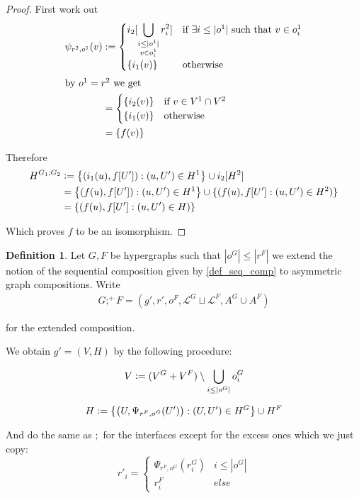 \documentclass[12pt]{article}
\theoremstyle{definition}
\newtheorem{definition}[theorem]{Definition}
\newcommand{\defeq}{\vcentcolon=}
\newcommand{\1}{\mathbbm{1}}
\renewcommand{\L}{\mathcal{L}}
\newcommand{\seq}{;}
\begin{document}
\begin{proof}
    First work out
    \begin{align*}
        \psi_{r^2, o^1}(v) &:= 
        \begin{cases}
            i_2[\displaystyle\bigcup_{\substack{i\leq |o^1| \\ v \in o^1_i}} r^2_i]& \text{if } \exists i \leq |o^1| \text{ such that } v \in o^1_i \\
            \{i_1(v)\} & \text{otherwise}
        \end{cases}\\
        \intertext{by $o^1=r^2$ we get}
        &=
        \begin{cases}
            \{i_2(v)\} & \text{if } v\in V^1\cap V^2\\
            \{i_1(v)\} & \text{otherwise}
        \end{cases}\\
        &= \{f(v)\}
    \end{align*}

    Therefore
    \begin{align*}
        H^{G_1;G_2} &\defeq \left\{ \left(i_1(u), f[U']\right) : (u, U') \in H^1 \right\} \cup i_2[H^2]\\
        &= \left\{ \left(f(u), f[U']\right) : (u, U') \in H^1 \right\} \cup \{(f(u), f[U'] : (u,U')\in H^2)\}\\
        &= \{(f(u), f[U'] : (u,U')\in H)\}\\
    \end{align*}

    Which proves $f$ to be an isomorphism.
    
\end{proof}

\begin{definition}
    Let $G,F$ be hypergraphs such that $|o^G| \leq |r^F|$ we extend the notion of the sequential composition given by \ref{def_seq_comp} to asymmetric graph compositions. Write 
    \begin{align*}
        G\seq^+ F = (g', r', o^F, \L^G\sqcup \L^F, A^G\cup A^F)
    \end{align*}

    for the extended composition.

    We obtain $g' = (V,H)$ by the following procedure:

    \[
        V \defeq (V^G + V^F) \setminus \bigcup_{i\leq |o^G|}o^G_i    
    \]
    
    \[
        H \defeq \left\{ \left(U, \Psi_{r^F, o^G}(U')\right) : (U, U') \in H^G \right\} \cup H^F
    \]

    And do the same as $\seq$ for the interfaces except for the excess ones which we just copy:
    \[
        r'_i = 
        \begin{cases}
            \Psi_{r^F, o^G}(r^G_i) & i\leq |o^G|\\
            r^F_i & else
        \end{cases}
    \]
\end{definition} %
\end{document}
